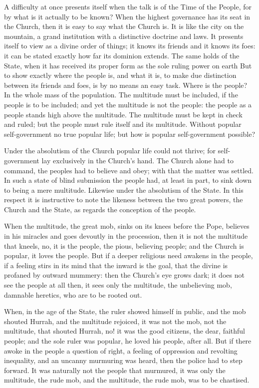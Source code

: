 \documentclass[12pt,a4paper,openany]{book}
\newcommand{\opage}[1]{\marginnote{\footnotesize\textit{[#1]}}}
\begin{document}
A difficulty at once presents itself when the talk
is of the Time of the People, for by what is it actually to be
known? When the highest governance has its seat in
the Church, then it is easy to say what the Church is. It
is like the city on the mountain, a grand institution
with a distinctive doctrine and laws. It presents itself to
view as a divine order of things; it knows
its friends and it knows its foes: it can
be stated exactly how far its dominion extends.
The same holds of the State, when it has received its
\setcounter{footnote}{0}%
\opage{7}proper form as the sole ruling power on earth
But to show exactly where the people is, and what it
is, to make due distinction between its friends and
foes, is by no means an easy task. Where is
the people? In the whole mass of the population. The multitude must
be included, if the people is to be included; and yet the multitude is not
the people: the people as a people stands high above the multitude.
The multitude must be kept in check and ruled; but the people must rule
itself and its multitude. Without popular self-government
no true popular life; but how is popular self-government
possible?

Under the absolutism of the Church popular life could not
thrive; for self-government lay exclusively in the Church's
hand. The Church alone had to command, the peoples had to
believe and obey; with that the matter was settled. In such a
state of blind submission the people had, at least
in part, to sink down to being a mere multitude.
Likewise under the absolutism of the State. In this respect it is
instructive to note the likeness between
the two great powers, the Church and the State, as regards the conception
of the people.

When the multitude, the great mob, sinks on its knees before
the Pope, believes in his miracles and goes devoutly in
the procession, then it is not the multitude that kneels,
no, it is the people, the pious, believing people; and the Church
is popular, it loves the people. But if a deeper religious
need awakens in the people, if a feeling stirs in its
mind that the inward is the goal, that the
divine is profaned by outward mummery: then
the Church's eye grows dark; it does not see the people at all then,
it sees only the multitude, the unbelieving mob, damnable
heretics, who are to be rooted out.

\setcounter{footnote}{0}%
\opage{8}When, in the age of the State, the ruler showed himself
in public, and the mob shouted Hurrah, and the multitude rejoiced,
it was not the mob, not the multitude, that shouted
Hurrah, no! it was the good citizens, the dear, faithful
people; and the sole ruler was popular, he loved
his people, after all. But if there awoke in the people a question
of right, a feeling of oppression and revolting
inequality, and an uncanny murmuring was heard, then the
police had to step forward. It was naturally not the people that
murmured, it was only the multitude, the rude mob, and
the multitude, the rude mob, was to be chastised.
\end{document}
